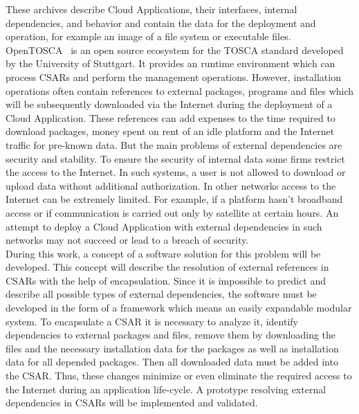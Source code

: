 These archives describe Cloud Applications, their interfaces, internal dependencies, and behavior and contain the data for the deployment and operation, for example an image of a file system or executable files.\\
OpenTOSCA~\cite*{OpenTOSCA} is an open source ecosystem for the TOSCA standard developed by the University of Stuttgart.
It provides an runtime environment which can process CSARs and perform the management operations. %
However, installation operations often contain references to external packages, programs and files which will be subsequently downloaded via the Internet during the deployment of a Cloud Application.
These references can add expenses to the time required to download packages, money spent on rent of an idle platform and the Internet traffic for pre-known data.
But the main problems of external dependencies are security and stability.
To ensure the security of internal data some firms restrict the access to the Internet.
In such systems, a user is not allowed to download or upload data without additional authorization.
In other networks access to the Internet can be extremely limited.
For example, if a platform hasn't broadband access or if communication is carried out only by satellite at certain hours.
An attempt to deploy a Cloud Application with external dependencies in such networks may not succeed or lead to a breach of security. \\
During this work, a concept of a software solution for this problem will be developed.
This concept will describe the resolution of external references in CSARs with the help of encapsulation.
Since it is impossible to predict and describe all possible types of external dependencies, the software must be developed in the form of a framework which means an easily expandable modular system. 
To encapsulate a CSAR it is necessary to analyze it, identify dependencies to external packages and files, remove them by downloading the files and the necessary installation data for the packages as well as installation data for all depended packages. 
Then all downloaded data must be added into the CSAR.
Thus, these changes minimize or even eliminate the required access to the Internet during an application life-cycle.
A prototype resolving external dependencies in CSARs will be implemented and validated.
\clearpage 
